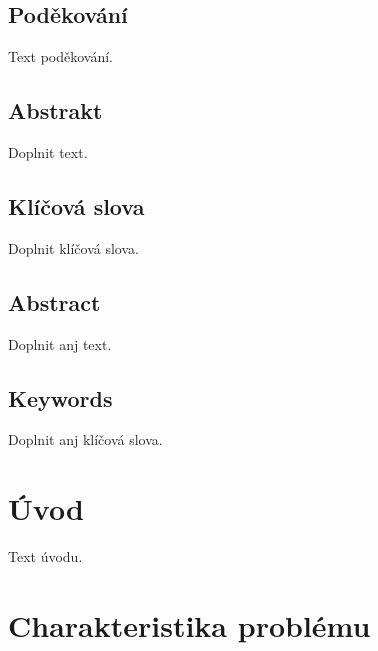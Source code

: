 \documentclass[12pt, a4paper]{report}
\begin{document}
	\clearpage\mbox{}\clearpage %
	
	\vspace*{\fill}
	\section*{Poděkování}
	\noindent Text poděkování.
	
	\clearpage\mbox{}\clearpage %
	
	\section*{Abstrakt}
	Doplnit text.
	
	\section*{Klíčová slova}
	Doplnit klíčová slova.
	
	\clearpage\mbox{}\clearpage %
	
	\section*{Abstract}
	Doplnit anj text.
	
	\section*{Keywords}
	Doplnit anj klíčová slova.
	
	\clearpage\mbox{}\clearpage %
	
	\tableofcontents %
	\renewcommand{\thepage}{\arabic{page}} %
	\renewcommand{\baselinestretch}{1.5} %
	
	\normalsize %
	
	\chapter*{Úvod}
	\pagestyle{plain} %
	\setcounter{page}{1} %
	Text úvodu.
	
	\chapter{Charakteristika problému}
\end{document}
